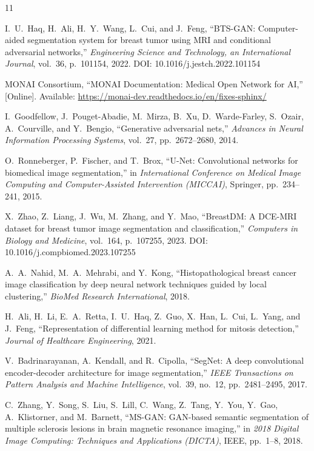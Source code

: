 \documentclass[10pt,journal,compsoc]{IEEEtran}
\begin{document}
\begin{thebibliography}{11}

I.~U.~Haq, H.~Ali, H.~Y.~Wang, L.~Cui, and J.~Feng,
``BTS-GAN: Computer-aided segmentation system for breast tumor using MRI and conditional adversarial networks,''
\emph{Engineering Science and Technology, an International Journal},
vol.~36, p.~101154, 2022. DOI: 10.1016/j.jestch.2022.101154

MONAI Consortium,
``MONAI Documentation: Medical Open Network for AI,''
[Online]. Available: \url{https://monai-dev.readthedocs.io/en/fixes-sphinx/}

I.~Goodfellow, J.~Pouget-Abadie, M.~Mirza, B.~Xu, D.~Warde-Farley, S.~Ozair, A.~Courville, and Y.~Bengio,
``Generative adversarial nets,''
\emph{Advances in Neural Information Processing Systems},
vol.~27, pp.~2672--2680, 2014.

O.~Ronneberger, P.~Fischer, and T.~Brox,
``U-Net: Convolutional networks for biomedical image segmentation,''
in \emph{International Conference on Medical Image Computing and Computer-Assisted Intervention (MICCAI)},
Springer, pp.~234--241, 2015.

X.~Zhao, Z.~Liang, J.~Wu, M.~Zhang, and Y.~Mao,
``BreastDM: A DCE-MRI dataset for breast tumor image segmentation and classification,''
\emph{Computers in Biology and Medicine},
vol.~164, p.~107255, 2023. DOI: 10.1016/j.compbiomed.2023.107255

A.~A.~Nahid, M.~A.~Mehrabi, and Y.~Kong,
``Histopathological breast cancer image classification by deep neural network techniques guided by local clustering,''
\emph{BioMed Research International},
2018.

H.~Ali, H.~Li, E.~A.~Retta, I.~U.~Haq, Z.~Guo, X.~Han, L.~Cui, L.~Yang, and J.~Feng,
``Representation of differential learning method for mitosis detection,''
\emph{Journal of Healthcare Engineering},
2021.

V.~Badrinarayanan, A.~Kendall, and R.~Cipolla,
``SegNet: A deep convolutional encoder-decoder architecture for image segmentation,''
\emph{IEEE Transactions on Pattern Analysis and Machine Intelligence},
vol.~39, no.~12, pp.~2481--2495, 2017.

C.~Zhang, Y.~Song, S.~Liu, S.~Lill, C.~Wang, Z.~Tang, Y.~You, Y.~Gao, A.~Klistorner, and M.~Barnett,
``MS-GAN: GAN-based semantic segmentation of multiple sclerosis lesions in brain magnetic resonance imaging,''
in \emph{2018 Digital Image Computing: Techniques and Applications (DICTA)},
IEEE, pp.~1--8, 2018.


\end{thebibliography}
\end{document}
